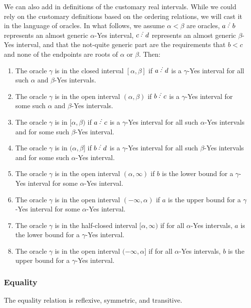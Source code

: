 \documentclass[12pt]{article}
\begin{document}
We can also add in definitions of the customary real intervals. While we could rely on the customary definitions based on the ordering relations, we will cast it in the language of oracles. In what follows, we assume $\alpha < \beta$ are oracles,  $a\lte b$ represents an almost generic $\alpha$-Yes interval, $c\lte d$ represents an almost generic $\beta$-Yes interval, and that the not-quite generic part are the requirements that $b < c$ and none of the endpoints are roots of $\alpha$ or $\beta$. Then: 

\begin{enumerate}
\item The oracle $\gamma$ is in the closed interval $[\alpha, \beta]$ if $a \lte  d$ is a $\gamma$-Yes interval for all such $\alpha$ and $\beta$-Yes intervals. 
\item The oracle $\gamma$ is in the open interval $(\alpha, \beta)$ if $b\lte c$ is a $\gamma$-Yes interval for some such $\alpha$ and $\beta$-Yes intervals. 
\item The oracle $\gamma$ is in $[\alpha, \beta)$ if $a\lte c$ is a $\gamma$-Yes interval for all such $\alpha$-Yes intervals and for some such $\beta$-Yes interval.
\item The oracle $\gamma$ is in $(\alpha, \beta]$ if $b\lte d$ is a $\gamma$-Yes interval for all such $\beta$-Yes intervals and for some such $\alpha$-Yes interval.
\item The oracle $\gamma$ is in the open interval $(\alpha, \infty)$ if $b$ is the lower bound for a $\gamma$-Yes interval for some $\alpha$-Yes interval. 
\item The oracle $\gamma$ is in the open interval $(-\infty, \alpha)$ if $a$ is the upper bound for a $\gamma$-Yes interval for some $\alpha$-Yes interval. 
\item The oracle $\gamma$ is in the half-closed interval $[\alpha, \infty)$ if for all $\alpha$-Yes intervals, $a$ is the lower bound for a $\gamma$-Yes interval. 
\item The oracle $\gamma$ is in the open interval $(-\infty, \alpha]$ if for all $\alpha$-Yes intervals, $b$ is the upper bound for a $\gamma$-Yes interval. 
\end{enumerate}



\subsubsection{Equality}\label{sec:eq}

\begin{proposition}\label{pr:reflexive}
The equality relation is reflexive, symmetric, and transitive. 
\end{proposition}
\end{document}
